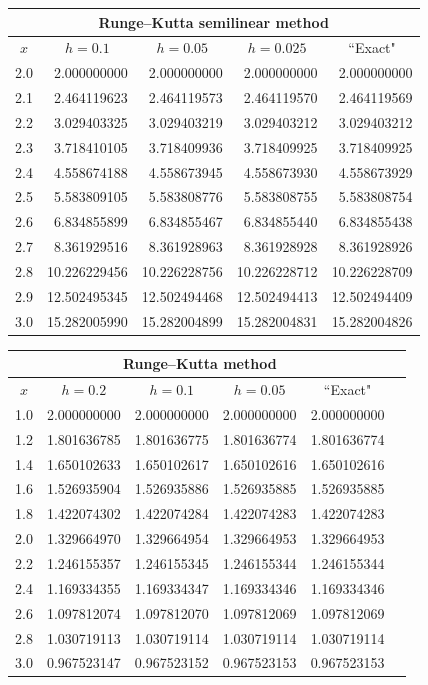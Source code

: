 \documentclass[dvips]{book}
\renewcommand{\exer}[1]{\par\medskip\;\noindent{\color{red}\bf #1.}}
\numberwithin{example}{section}
\numberwithin{equation}{section}
\numberwithin{theorem}{section}
\numberwithin{table}{section}
\numberwithin{figure}{section}
\begin{document}
{\small
\begin{tabular}{|c|r|r|r|r|}
\hline
\multicolumn{5}{|c|}{Runge--Kutta semilinear method}\\\hline
\multicolumn{1}{|c|}{$x$}&
\multicolumn{1}{|c|}{$h=0.1$}&
\multicolumn{1}{|c|}{$h=0.05$}&
\multicolumn{1}{|c|}{$h=0.025$}&
\multicolumn{1}{|c|}{``Exact"}\\ \hline
2.0 &  2.000000000 &  2.000000000 &  2.000000000 &  2.000000000 \\
2.1 &  2.464119623 &  2.464119573 &  2.464119570 &  2.464119569 \\
2.2 &  3.029403325 &  3.029403219 &  3.029403212 &  3.029403212 \\
2.3 &  3.718410105 &  3.718409936 &  3.718409925 &  3.718409925 \\
2.4 &  4.558674188 &  4.558673945 &  4.558673930 &  4.558673929 \\
2.5 &  5.583809105 &  5.583808776 &  5.583808755 &  5.583808754 \\
2.6 &  6.834855899 &  6.834855467 &  6.834855440 &  6.834855438 \\
2.7 &  8.361929516 &  8.361928963 &  8.361928928 &  8.361928926 \\
2.8 & 10.226229456 & 10.226228756 & 10.226228712 & 10.226228709 \\
2.9 & 12.502495345 & 12.502494468 & 12.502494413 & 12.502494409 \\
3.0 & 15.282005990 & 15.282004899 & 15.282004831 & 15.282004826 \\
\hline
\end{tabular}}

\exer{3.3.16}
{\small
\begin{tabular}{|c|r|r|r|r|r|}
\hline
\multicolumn{5}{|c|}{Runge--Kutta method}\\\hline
\multicolumn{1}{|c|}{$x$}&
\multicolumn{1}{|c|}{$h=0.2$}&
\multicolumn{1}{|c|}{$h=0.1$}&
\multicolumn{1}{|c|}{$h=0.05$}&
\multicolumn{1}{|c|}{``Exact"}\\ \hline
1.0 & 2.000000000 & 2.000000000 & 2.000000000 & 2.000000000 \\
1.2 & 1.801636785 & 1.801636775 & 1.801636774 & 1.801636774 \\
1.4 & 1.650102633 & 1.650102617 & 1.650102616 & 1.650102616 \\
1.6 & 1.526935904 & 1.526935886 & 1.526935885 & 1.526935885 \\
1.8 & 1.422074302 & 1.422074284 & 1.422074283 & 1.422074283 \\
2.0 & 1.329664970 & 1.329664954 & 1.329664953 & 1.329664953 \\
2.2 & 1.246155357 & 1.246155345 & 1.246155344 & 1.246155344 \\
2.4 & 1.169334355 & 1.169334347 & 1.169334346 & 1.169334346 \\
2.6 & 1.097812074 & 1.097812070 & 1.097812069 & 1.097812069 \\
2.8 & 1.030719113 & 1.030719114 & 1.030719114 & 1.030719114 \\
3.0 & 0.967523147 & 0.967523152 & 0.967523153 & 0.967523153 \\
\hline
\end{tabular}}
\end{document}
